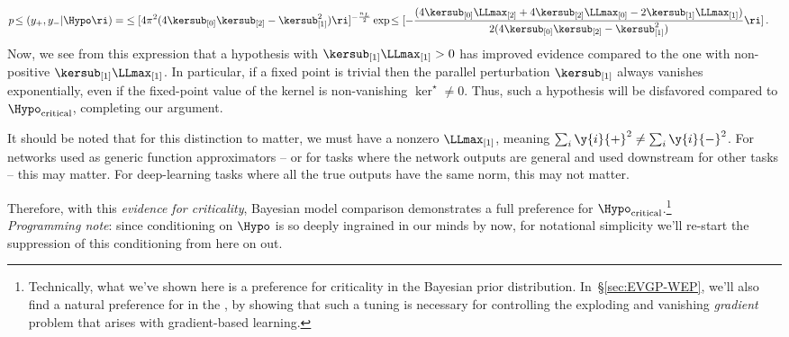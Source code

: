 {\begin{align}
p\!\le(y_{+},y_{-} \vert\Hypo\ri)=&\le[4\pi^2 (4\kersub_{[0]}\kersub_{[2]}-\kersub_{[1]}^2)\ri]^{-\frac{n_{L}}{2}} \exp\!\le[-\frac{(4\kersub_{[0]}\LLmax_{[2]}+4\kersub_{[2]}\LLmax_{[0]}-2\kersub_{[1]}\LLmax_{[1]})}{2(4\kersub_{[0]}\kersub_{[2]}-\kersub_{[1]}^2)}\ri]\, .
\end{align}
Now, we see from this expression that a hypothesis with $\kersub_{[1]}\LLmax_{[1]}>0$ has improved evidence compared to the one with non-positive $\kersub_{[1]}\LLmax_{[1]}$. In particular, if a fixed point is trivial then the parallel perturbation $\kersub_{[1]}$ always vanishes exponentially, even if the fixed-point value of the kernel is non-vanishing $\ker^{\star}\ne0$. Thus, such a hypothesis will be disfavored compared to $\Hypo_{\text{critical}}$,  completing our argument.

It should be noted that for this distinction to matter, we must have a nonzero $\LLmax_{[1]}$, meaning $\sum_{i}\y{i}{+}^2\ne \sum_{i}\y{i}{-}^2$. For networks used as generic function approximators -- or for tasks where the network outputs are general and used downstream for other tasks -- this may matter. For deep-learning tasks where all the true outputs have the same norm, this may not matter.}
Therefore, with this \emph{evidence for criticality}, Bayesian model comparison demonstrates a full preference for $\Hypo_{\text{critical}}$.\footnote{Technically, what we've shown here is a preference for criticality in the Bayesian prior distribution. In~\S\ref{sec:EVGP-WEP}, we'll also find a natural preference for  in the , by showing that such a tuning is necessary for controlling the exploding and vanishing \emph{gradient} problem that arises with gradient-based learning.} \\






\noindent{}\emph{Programming note}: since conditioning on $\Hypo$ is so deeply ingrained in our minds by now, for notational simplicity we'll re-start the suppression of this conditioning from here on out.







